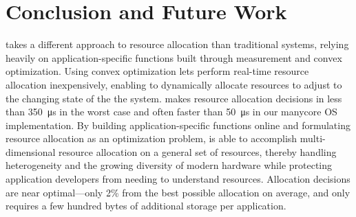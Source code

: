 \chapter{Conclusion and Future Work}
\pacora takes a different approach to resource allocation than traditional systems, relying heavily on application-specific functions built through measurement and convex optimization.  Using convex optimization lets \pacora perform real-time resource allocation inexpensively, enabling \pacora to dynamically allocate resources to adjust to the changing state of the the system.  \pacora makes resource allocation decisions in less than \SI{350}{\micro\second} in the worst case and often faster than \SI{50}{\micro\second} in our manycore OS implementation. By building application-specific functions online and formulating resource allocation as an optimization problem, \pacora is able to accomplish multi-dimensional resource allocation on a general set of resources, thereby handling heterogeneity and the growing diversity of modern hardware while protecting application developers from needing to understand resources. Allocation decisions are near optimal---only 2\% from the best possible allocation on average, and \pacora only requires a few hundred bytes of additional storage per application.